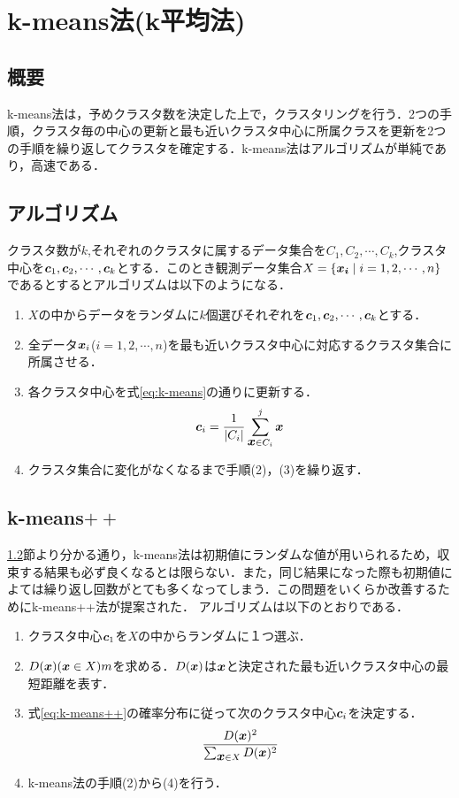 \documentclass[a4j]{jsarticle}
\def\vec#1{\mbox{\boldmath $#1$}}
\begin{document}
\section{k-means法(k平均法)}
\subsection{概要}
k-means法は，予めクラスタ数を決定した上で，クラスタリングを行う．2つの手順，クラスタ毎の中心の更新と最も近いクラスタ中心に所属クラスを更新を2つの手順を繰り返してクラスタを確定する．k-means法はアルゴリズムが単純であり，高速である．
\subsection{アルゴリズム}
\label{sec:km-algo}
クラスタ数が$k$,それぞれのクラスタに属するデータ集合を$C_1,C_2,\cdots,C_k$,クラスタ中心を$\vec c_1,\vec c_2,\cdots,\vec c_k$とする．このとき観測データ集合$X=\{\vec{x_i}\mid i=1,2,\cdots,n\}$であるとするとアルゴリズムは以下のようになる．
\begin{enumerate}
\item $X$の中からデータをランダムに$k$個選びそれぞれを$\vec c_1,\vec c_2,\cdots,\vec c_k$とする．
\item 全データ$\vec x_i$($i=1,2,\cdots,n$)を最も近いクラスタ中心に対応するクラスタ集合に所属させる．
\item 各クラスタ中心を式\ref{eq:k-means}の通りに更新する．
\begin{equation}
\vec c_i=\frac{1}{|C_i|}\sum_{\vec x \in C_i}^{j}\vec x
\label{eq:k-means}
\end{equation}
\item クラスタ集合に変化がなくなるまで手順(2)，(3)を繰り返す．
\end{enumerate}

\subsection{k-means$++$}
\ref{sec:km-algo}節より分かる通り，k-means法は初期値にランダムな値が用いられるため，収束する結果も必ず良くなるとは限らない．また，同じ結果になった際も初期値によては繰り返し回数がとても多くなってしまう．この問題をいくらか改善するためにk-means++法が提案された．
アルゴリズムは以下のとおりである．
\begin{enumerate}
\item クラスタ中心$\vec c_1$を$X$の中からランダムに１つ選ぶ．
\item $D(\vec x)(\vec x\in X)m$を求める．$D(\vec x)$は$\vec x$と決定された最も近いクラスタ中心の最短距離を表す．
\item 式\ref{eq:k-means++}の確率分布に従って次のクラスタ中心$\vec c_i$を決定する．
\begin{equation}
\frac{D(\vec x)^2}{\sum_{\vec x\in X}D(\vec x)^2}
\label{eq:k-means++}
\end{equation}
\item k-means法の手順(2)から(4)を行う．
\end{enumerate}
\end{document}
